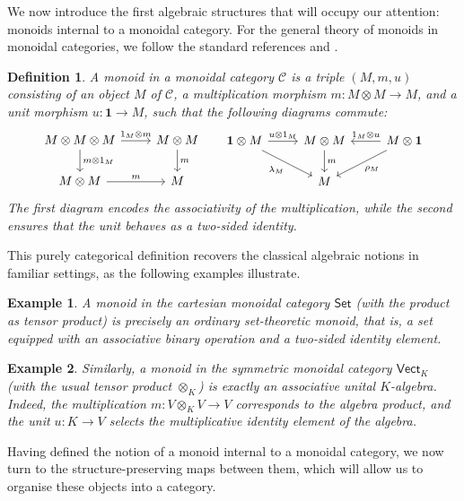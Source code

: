\documentclass{amsart}
\newcommand{\Set}{\mathsf{Set}}
\newcommand{\Vect}{\mathsf{Vect}}
\newcommand{\VectK}{\Vect_K}
\newtheorem{definition}{Definition}[section]
\newtheorem{example}{Example}[section]
\begin{document}
We now introduce the first algebraic structures that will occupy our attention: monoids internal to a monoidal category. For the general theory of monoids in monoidal categories, we follow the standard references \cite{MF} and \cite{borceux1994handbook}.

\begin{definition}\label{def:monoid}
A monoid in a monoidal category $\mathcal{C}$ is a triple $(M, m, u)$ consisting of an object $M$ of $\mathcal{C}$, a multiplication morphism $m \colon M \otimes M \longrightarrow M$, and a unit morphism $u \colon \mathbf{1} \longrightarrow M$, such that the following diagrams commute:
\[
\begin{tikzcd}
M\otimes M\otimes M\arrow{r}{1_M\otimes m} \arrow{d}{m\otimes 1_M}& M\otimes M\arrow{d}{m}\\
M\otimes M\arrow{r}{m} & M
\end{tikzcd}
\;\;\;\;\;
\begin{tikzcd}
\mathbf{1}\otimes M\arrow{r}{u\otimes 1_M}\arrow[swap]{dr}{\lambda_M} & M\otimes M\arrow{d}{m} & M\otimes \mathbf{1}\arrow[swap]{l}{1_M\otimes u}\arrow{dl}{\rho_M}\\
&M
\end{tikzcd}
\]
The first diagram encodes the associativity of the multiplication, while the second ensures that the unit behaves as a two-sided identity.
\end{definition}

This purely categorical definition recovers the classical algebraic notions in familiar settings, as the following examples illustrate.

\begin{example}\label{ex:monoid_set}
A monoid in the cartesian monoidal category $\Set$ (with the product as tensor product) is precisely an ordinary set-theoretic monoid, that is, a set equipped with an associative binary operation and a two-sided identity element.
\end{example}

\begin{example}\label{ex:monoid_vect}
Similarly, a monoid in the symmetric monoidal category $\VectK$ (with the usual tensor product $\otimes_K$) is exactly an associative unital $K$-algebra. Indeed, the multiplication $m \colon V \otimes_K V \to V$ corresponds to the algebra product, and the unit $u \colon K \to V$ selects the multiplicative identity element of the algebra.
\end{example}

Having defined the notion of a monoid internal to a monoidal category, we now turn to the structure-preserving maps between them, which will allow us to organise these objects into a category.
\end{document}
